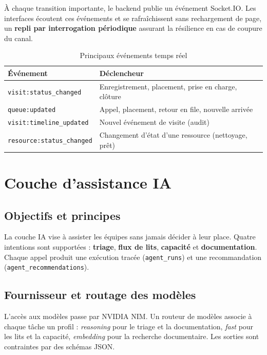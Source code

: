 À chaque transition importante, le backend publie un événement Socket.IO. Les interfaces écoutent ces événements et se rafraîchissent sans rechargement de page, un \textbf{repli par interrogation périodique} assurant la résilience en cas de coupure du canal.

\begin{table}[H]
\centering
\caption{Principaux événements temps réel}
\label{tab:evenements}
\small
\begin{tabular}{|l|p{8.6cm}|}
\hline
\textbf{Événement} & \textbf{Déclencheur} \\
\hline
\texttt{visit:status\_changed} & Enregistrement, placement, prise en charge, clôture \\
\hline
\texttt{queue:updated} & Appel, placement, retour en file, nouvelle arrivée \\
\hline
\texttt{visit:timeline\_updated} & Nouvel événement de visite (audit) \\
\hline
\texttt{resource:status\_changed} & Changement d'état d'une ressource (nettoyage, prêt) \\
\hline
\end{tabular}
\end{table}

\section{Couche d'assistance IA}

\subsection{Objectifs et principes}

La couche IA vise à assister les équipes sans jamais décider à leur place. Quatre intentions sont supportées : \textbf{triage}, \textbf{flux de lits}, \textbf{capacité} et \textbf{documentation}. Chaque appel produit une exécution tracée (\texttt{agent\_runs}) et une recommandation (\texttt{agent\_recommendations}).

\subsection{Fournisseur et routage des modèles}

L'accès aux modèles passe par NVIDIA NIM. Un routeur de modèles associe à chaque tâche un profil : \textit{reasoning} pour le triage et la documentation, \textit{fast} pour les lits et la capacité, \textit{embedding} pour la recherche documentaire. Les sorties sont contraintes par des schémas JSON.


